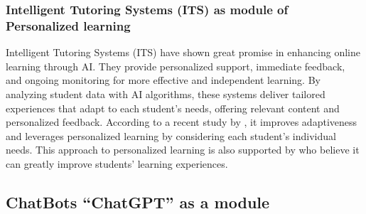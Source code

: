 
\subsubsection{Intelligent Tutoring Systems (ITS) as module of Personalized learning}

Intelligent Tutoring Systems (ITS) have shown great promise in enhancing online learning through  AI.
They provide personalized support, immediate feedback, and ongoing monitoring for more effective and independent learning.
By analyzing student data with AI algorithms, these systems deliver tailored experiences that adapt to each student's needs,
offering relevant content and personalized feedback. According to a recent study by \citep{l_d_of_cs_akshara_first_grade_college_2023},
it improves adaptiveness and leverages personalized learning by considering each student's individual needs.
This approach to personalized learning is also supported by \citep{bradac_design_2022} who believe it can greatly
improve students' learning experiences.

\subsection{ChatBots ``ChatGPT'' as a module}

